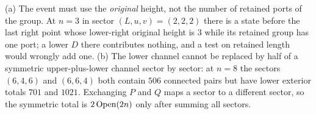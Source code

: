 \begin{remark}
\label{rem:shortcuts}
(a) The event must use the \emph{original} height, not the number of retained
ports of the group. At $n=3$ in sector $(L,u,v)=(2,2,2)$ there is a state
before the last right point whose lower-right original height is $3$ while its
retained group has one port; a lower $D$ there contributes nothing, and a test
on retained length would wrongly add one.
(b) The lower channel cannot be replaced by half of a symmetric upper-plus-lower
channel sector by sector: at $n=8$ the sectors $(6,4,6)$ and $(6,6,4)$ both
contain $506$ connected pairs but have lower exterior totals $701$ and
$1021$. Exchanging $P$ and $Q$ maps a sector to a different sector, so the
symmetric total is $2\operatorname{Open}(2n)$ only after summing all sectors.
\end{remark}
